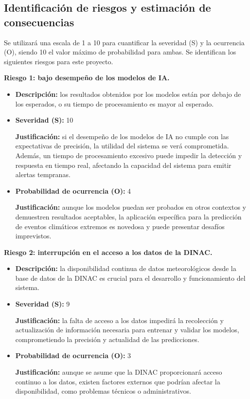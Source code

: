 \documentclass[
11pt, %
codirector, %
]{charter}
\begin{document}
\subsection{Identificación de riesgos y estimación de consecuencias}

Se utilizará una escala de 1 a 10 para cuantificar la severidad (S) y la ocurrencia (O), siendo 10 el valor máximo de probabilidad para ambas. Se identifican los siguientes riesgos para este proyecto.

\textbf{Riesgo 1: bajo desempeño de los modelos de IA.}
\begin{itemize}
  \item \textbf{Descripción:} los resultados obtenidos por los modelos están por debajo de los esperados, o su tiempo de procesamiento es mayor al esperado.
  \item \textbf{Severidad (S):} 10
  
  \textbf{Justificación:} si el desempeño de los modelos de IA no cumple con las expectativas de precisión, la utilidad del sistema se verá comprometida. Además, un tiempo de procesamiento excesivo puede impedir la detección y respuesta en tiempo real, afectando la capacidad del sistema para emitir alertas tempranas.
  \item \textbf{Probabilidad de ocurrencia (O):} 4
  
  \textbf{Justificación:} aunque los modelos puedan ser probados en otros contextos y demuestren resultados aceptables, la aplicación específica para la predicción de eventos climáticos extremos es novedosa y puede presentar desafíos imprevistos.
\end{itemize}

\textbf{Riesgo 2: interrupción en el acceso a los datos de la DINAC.}

\begin{itemize}
  \item \textbf{Descripción:} la disponibilidad continua de datos meteorológicos desde la base de datos de la DINAC es crucial para el desarrollo y funcionamiento del sistema.
  \item \textbf{Severidad (S):} 9
  
  \textbf{Justificación:} la falta de acceso a los datos impedirá la recolección y actualización de información necesaria para entrenar y validar los modelos, comprometiendo la precisión y actualidad de las predicciones.
  \item \textbf{Probabilidad de ocurrencia (O):} 3
  
  \textbf{Justificación:} aunque se asume que la DINAC proporcionará acceso continuo a los datos, existen factores externos que podrían afectar la disponibilidad, como problemas técnicos o administrativos.
\end{itemize}
\end{document}
